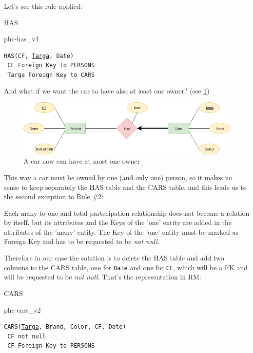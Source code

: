 \documentclass[class=book, crop=false, oneside]{standalone}
\newcommand\tab[1][1cm]{\hspace*{#1}}
\begin{document}
Let's see this rule applied:
\vskip 20pt
\begin{minipage}{.8\textwidth}
	HAS
	\begin{table}[H]
		{phc-has_v1}
	\end{table}
	\texttt{HAS(CF, \underline{Targa}, Date)}\\
	\tab[.4cm] \texttt{	CF Foreign Key to PERSONS}\\
	\tab[.4cm] \texttt{	Targa Foreign Key to CARS}
\end{minipage}
\vskip 20pt
And what if we want the car to have also at least one owner? (see \ref{diagram1_02})
\begin{figure}[H]
	\centering
	\includegraphics[width=\textwidth,keepaspectratio]{diagram1_02.png}
	\caption{A car now can have at most one owner}
	\label{diagram1_02}
\end{figure}
This way a car must be owned by one (and only one) person, so it makes no sense to keep separately the HAS table and the CARS table, and this leads us to the second exception to Rule \#2:

Each many to one and total partecipation relationship does not become a relation by itself, but its attributes and the Keys of the 'one' entity are added in the attributes of the 'many' entity. The Key of the 'one' entity must be marked as Foreign Key and has to be requested to be \emph{not null}.

Therefore in our case the solution is to delete the HAS table and add two columns to the CARS table, one for \texttt{Date} and one for \texttt{CF}, which will be a FK and will be requested to be \emph{not null}.
That's the representation in RM:
\vskip 20pt
\begin{minipage}{.8\textwidth}
	CARS
	\begin{table}[H]
		{phc-cars_v2}
	\end{table}
	\texttt{CARS(\underline{Targa}, Brand, Color, CF, Date)}\\
	\tab[.4cm] \texttt{	CF not null}\\
	\tab[.4cm] \texttt{	CF Foreign Key to PERSONS}
\end{minipage}
\vskip 20pt
\end{document}

